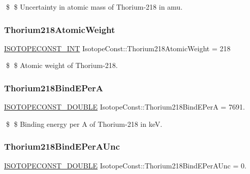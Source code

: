 \$ \$ Uncertainty in atomic mass of Thorium-\/218 in amu. \mbox{\label{group___isotope_const-_thorium-_th218_ga8f67bf11ef971834adaee59917e6c6c0}} 
\subsubsection{\texorpdfstring{Thorium218\+Atomic\+Weight}{Thorium218AtomicWeight}}
{\footnotesize\ttfamily \mbox{\hyperlink{group___isotope_const-_macros_ga5f18360b3e99483a35c32d789e62621c}{I\+S\+O\+T\+O\+P\+E\+C\+O\+N\+S\+T\+\_\+\+I\+NT}} Isotope\+Const\+::\+Thorium218\+Atomic\+Weight = 218}

\$ \$ Atomic weight of Thorium-\/218. \mbox{\label{group___isotope_const-_thorium-_th218_gab1887c49fa7e4313f03b127662b71908}} 
\subsubsection{\texorpdfstring{Thorium218\+Bind\+E\+PerA}{Thorium218BindEPerA}}
{\footnotesize\ttfamily \mbox{\hyperlink{group___isotope_const-_macros_ga8f45a7272ce02c0b4c65c44636ed719a}{I\+S\+O\+T\+O\+P\+E\+C\+O\+N\+S\+T\+\_\+\+D\+O\+U\+B\+LE}} Isotope\+Const\+::\+Thorium218\+Bind\+E\+PerA = 7691.}

\$ \$ Binding energy per A of Thorium-\/218 in keV. \mbox{\label{group___isotope_const-_thorium-_th218_ga5a6bb7e76872ed716bef12de17aec7cf}} 
\subsubsection{\texorpdfstring{Thorium218\+Bind\+E\+Per\+A\+Unc}{Thorium218BindEPerAUnc}}
{\footnotesize\ttfamily \mbox{\hyperlink{group___isotope_const-_macros_ga8f45a7272ce02c0b4c65c44636ed719a}{I\+S\+O\+T\+O\+P\+E\+C\+O\+N\+S\+T\+\_\+\+D\+O\+U\+B\+LE}} Isotope\+Const\+::\+Thorium218\+Bind\+E\+Per\+A\+Unc = 0.}

